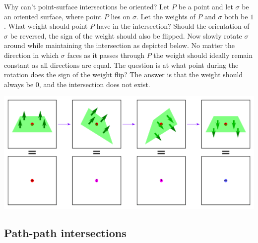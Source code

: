 Why can't point-surface intersections be oriented? Let \(P\) be a point and let \(\sigma\) be an oriented surface, where point \(P\) lies on \(\sigma\). Let the weights of \(P\) and \(\sigma\) both be \(1\). What weight should point \(P\) have in the intersection? Should the orientation of \(\sigma\) be reversed, the sign of the weight should also be flipped. Now slowly rotate \(\sigma\) around while maintaining the intersection as depicted below. No matter the direction in which \(\sigma\) faces as it passes through \(P\) the weight should ideally remain constant as all directions are equal. The question is at what point during the rotation does the sign of the weight flip? The answer is that the weight should always be \(0\), and the intersection does not exist.  

\begin{center}
\includegraphics[width = \textwidth]{Intersections/Undefined_intersections/point_surface_intersection_contradiction_2}
\end{center}



\subsection{Path-path intersections}

